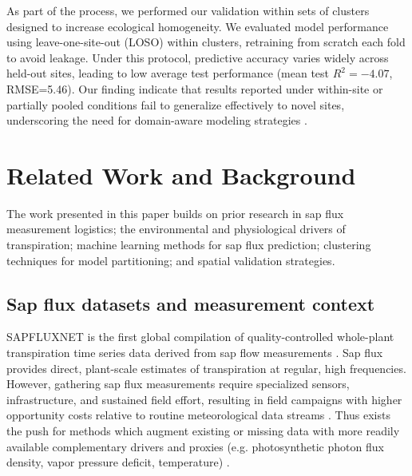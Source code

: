 \documentclass[graybox]{svmult}
\begin{document}
As part of the process, we performed our validation within sets of clusters designed to increase ecological homogeneity. We evaluated model performance using leave-one-site-out (LOSO) within clusters, retraining from scratch each fold to avoid leakage. Under this protocol, predictive accuracy varies widely across held-out sites, leading to low average test performance  (mean test $R^2=-4.07$, RMSE=5.46). Our finding indicate that results reported under within-site or partially pooled conditions fail to generalize effectively to novel sites, underscoring the need for domain-aware modeling strategies \cite{moreno-torres_unifying_2012, quinonero-candela_dataset_2009}.

\section{Related Work and Background}
\label{sec:2}

The work presented in this paper builds on prior research in sap flux measurement logistics; the environmental and physiological drivers of transpiration; machine learning methods for sap flux prediction; clustering techniques for model partitioning; and spatial validation strategies.

\subsection{Sap flux datasets and measurement context}
SAPFLUXNET is the first global compilation of quality-controlled whole-plant transpiration time series data derived from sap flow measurements \cite{poyatos_global_2021}. Sap flux provides direct, plant-scale estimates of transpiration at regular, high frequencies. However, gathering sap flux measurements require specialized sensors, infrastructure, and sustained field effort, resulting in field campaigns with higher opportunity costs relative to routine meteorological data streams \cite{poyatos_global_2021}. Thus exists the push for methods which augment existing or missing data with more readily available complementary drivers and proxies (e.g. photosynthetic photon flux density, vapor pressure deficit, temperature) \cite{ge_dynamics_2011}.
\end{document}
